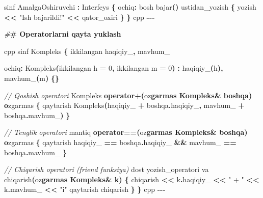 \documentclass[a4paper,11pt,twoside,openright]{book}
\newenvironment{Shaded}{\begin{snugshade}}{\end{snugshade}}
\newcommand{\CharTok}[1]{\textcolor[rgb]{0.31,0.60,0.02}{#1}}
\newcommand{\CommentTok}[1]{\textcolor[rgb]{0.56,0.35,0.01}{\textit{#1}}}
\newcommand{\DecValTok}[1]{\textcolor[rgb]{0.00,0.00,0.81}{#1}}
\newcommand{\ErrorTok}[1]{\textcolor[rgb]{0.64,0.00,0.00}{\textbf{#1}}}
\newcommand{\KeywordTok}[1]{\textcolor[rgb]{0.13,0.29,0.53}{\textbf{#1}}}
\newcommand{\NormalTok}[1]{#1}
\newcommand{\OperatorTok}[1]{\textcolor[rgb]{0.81,0.36,0.00}{\textbf{#1}}}
\newcommand{\PreprocessorTok}[1]{\textcolor[rgb]{0.56,0.35,0.01}{\textit{#1}}}
\newcommand{\StringTok}[1]{\textcolor[rgb]{0.31,0.60,0.02}{#1}}
\newcommand{\VariableTok}[1]{\textcolor[rgb]{0.00,0.00,0.00}{#1}}
\begin{document}
\begin{Shaded}
\begin{Highlighting}[]
\NormalTok{sinf AmalgaOshiruvchi }\OperatorTok{:}\NormalTok{ Interfeys }\OperatorTok{\{}
\NormalTok{ochiq}\OperatorTok{:}
\NormalTok{    bosh bajar}\OperatorTok{()}\NormalTok{ ustidan\_yozish }\OperatorTok{\{}
\NormalTok{        yozish }\OperatorTok{\textless{}\textless{}} \StringTok{"Ish bajarildi!"} \OperatorTok{\textless{}\textless{}}\NormalTok{ qator\_oxiri}
    \OperatorTok{\}}
\OperatorTok{\}}
\ErrorTok{\textasciigrave{}\textasciigrave{}\textasciigrave{}}\NormalTok{cpp}
\OperatorTok{{-}{-}{-}}

\PreprocessorTok{\#}\ErrorTok{\# Operatorlarni qayta yuklash}

\ErrorTok{\textasciigrave{}\textasciigrave{}\textasciigrave{}}\NormalTok{cpp}
\NormalTok{sinf Kompleks }\OperatorTok{\{}
\NormalTok{    ikkilangan }\VariableTok{haqiqiy\_}\OperatorTok{,} \VariableTok{mavhum\_}

\NormalTok{ochiq}\OperatorTok{:}
\NormalTok{    Kompleks}\OperatorTok{(}\NormalTok{ikkilangan h }\OperatorTok{=} \DecValTok{0}\OperatorTok{,}\NormalTok{ ikkilangan m }\OperatorTok{=} \DecValTok{0}\OperatorTok{)}
        \OperatorTok{:} \VariableTok{haqiqiy\_}\OperatorTok{(}\NormalTok{h}\OperatorTok{),} \VariableTok{mavhum\_}\OperatorTok{(}\NormalTok{m}\OperatorTok{)} \OperatorTok{\{\}}

    \CommentTok{// Qo\textquotesingle{}shish operatori}
\NormalTok{    Kompleks }\KeywordTok{operator}\OperatorTok{+(}\NormalTok{o}\CharTok{\textquotesingle{}z}\ErrorTok{garmas Kompleks\& boshqa) o}\CharTok{\textquotesingle{}}\NormalTok{zgarmas }\OperatorTok{\{}
\NormalTok{        qaytarish Kompleks}\OperatorTok{(}\VariableTok{haqiqiy\_} \OperatorTok{+}\NormalTok{ boshqa}\OperatorTok{.}\VariableTok{haqiqiy\_}\OperatorTok{,}
                          \VariableTok{mavhum\_} \OperatorTok{+}\NormalTok{ boshqa}\OperatorTok{.}\VariableTok{mavhum\_}\OperatorTok{)}
    \OperatorTok{\}}

    \CommentTok{// Tenglik operatori}
\NormalTok{    mantiq }\KeywordTok{operator}\OperatorTok{==(}\NormalTok{o}\CharTok{\textquotesingle{}z}\ErrorTok{garmas Kompleks\& boshqa) o}\CharTok{\textquotesingle{}}\NormalTok{zgarmas }\OperatorTok{\{}
\NormalTok{        qaytarish }\VariableTok{haqiqiy\_} \OperatorTok{==}\NormalTok{ boshqa}\OperatorTok{.}\VariableTok{haqiqiy\_} \OperatorTok{\&\&} \VariableTok{mavhum\_} \OperatorTok{==}\NormalTok{ boshqa}\OperatorTok{.}\VariableTok{mavhum\_}
    \OperatorTok{\}}

    \CommentTok{// Chiqarish operatori (friend funksiya)}
\NormalTok{    dost yozish\_operatori va chiqarish}\OperatorTok{(}\NormalTok{o}\CharTok{\textquotesingle{}z}\ErrorTok{garmas Kompleks\& k) \{}
\NormalTok{        chiqarish }\OperatorTok{\textless{}\textless{}}\NormalTok{ k}\OperatorTok{.}\VariableTok{haqiqiy\_} \OperatorTok{\textless{}\textless{}} \StringTok{" + "} \OperatorTok{\textless{}\textless{}}\NormalTok{ k}\OperatorTok{.}\VariableTok{mavhum\_} \OperatorTok{\textless{}\textless{}} \StringTok{"i"}
\NormalTok{        qaytarish chiqarish}
    \OperatorTok{\}}
\OperatorTok{\}}
\ErrorTok{\textasciigrave{}\textasciigrave{}\textasciigrave{}}\NormalTok{cpp}
\OperatorTok{{-}{-}{-}}


\end{Highlighting}
\end{Shaded}
\end{document}
